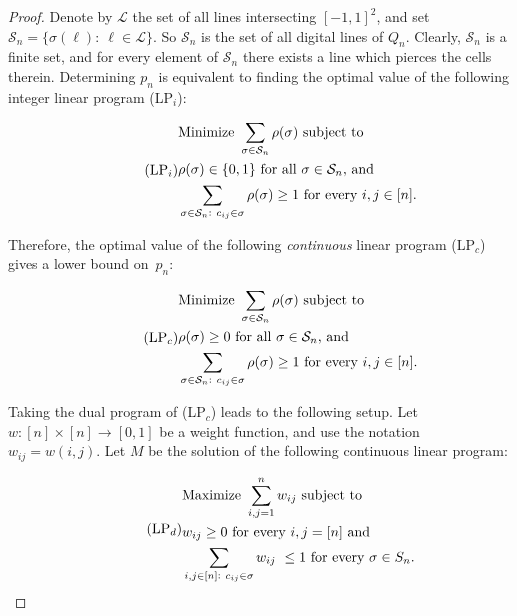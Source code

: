 \documentclass[11pt,a4paper]{amsart}
\newcommand{\Sc}{\mathcal{S}}
\newcommand{\Lc}{\mathcal{L}}
\begin{document}
\begin{proof}


Denote by $\Lc$ the set of all lines intersecting $[-1,1]^2$, and set $\Sc_n = \{ \sigma(\ell): \ \ell \in \Lc \}$. So $\Sc_n$ is the set of all  digital lines of $Q_n$.
Clearly, $\Sc_n$ is a finite set, and for every element of $\Sc_n$ there exists a line which pierces the cells therein.
Determining $p_n$ is equivalent to finding the optimal value of the following integer linear program (LP$_i$):


\begin{equation}
\tag*{\hspace{10 pt}(LP$_i$)}
\begin{aligned}
&\textrm{Minimize  }\sum_{\sigma \in \Sc_n} \rho(\sigma) \textrm{ subject to} \\
&\rho(\sigma) \in \{ 0, 1 \} \textrm{ for all } \sigma \in \Sc_n \textrm{, and }\\
&\sum_{\sigma \in \Sc_n:\ c_{ij} \in \sigma} \rho(\sigma) \geq 1 \textrm{  for every } i,j \in [n]
.
\end{aligned}
\end{equation}



Therefore, the optimal value of the following {\em continuous} linear program (LP$_c$) gives a lower bound on~$p_n$:


\begin{equation}
\tag*{\hspace{10 pt}(LP$_c$)}
\begin{aligned}
&\textrm{Minimize  }\sum_{\sigma \in \Sc_n} \rho(\sigma) \textrm{ subject to} \\
&\rho(\sigma) \geq 0 \textrm{ for all } \sigma \in \Sc_n \textrm{, and }\\
&\sum_{\sigma \in \Sc_n:\ c_{ij} \in \sigma} \rho(\sigma) \geq 1 \textrm{  for every } i,j \in [n]
.
\end{aligned}
\end{equation}

Taking  the dual program of (LP$_c$) leads to the following setup.
Let $w: [n]\times[n] \rightarrow [0,1]$  be a weight function, and use the notation $w_{ij} = w(i,j)$. Let $M$ be the solution of the following continuous linear program:

\begin{equation}
\tag*{\hspace{10 pt}(LP$_d$)}
\begin{aligned}
&\textrm{Maximize  }\sum_{i,j=1}^n w_{ij} \textrm{ subject to} \\
&w_{ij} \geq 0 \textrm{ for every } i,j =[n]\textrm{ and }\\
&\sum_{i,j \in [n]: \ c_{ij} \in \sigma} w_{ij}\   \leq 1
\textrm{ for every  } \sigma \in S_n.
\end{aligned}
\end{equation}


\end{proof}
\end{document}
